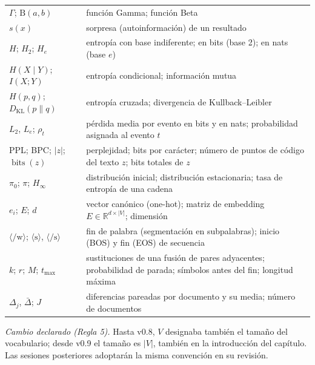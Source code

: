 {\begin{longtable}{@{}>{\raggedright\arraybackslash}p{37mm}>{\raggedright\arraybackslash}p{\dimexpr\textwidth-37mm-2\tabcolsep\relax}@{}}
$\Gamma$; $\mathrm B(a,b)$ & función Gamma; función Beta\\
$s(x)$ & sorpresa (autoinformación) de un resultado\\
$H$; $H_2$; $H_e$ & entropía con base indiferente; en bits (base 2); en nats (base $e$)\\
$H(X\mid Y)$; $I(X;Y)$ & entropía condicional; información mutua\\
$H(p,q)$; $D_{\mathrm{KL}}(p\|q)$ & entropía cruzada; divergencia de Kullback--Leibler\\
$L_2$, $L_e$; $\rho_t$ & pérdida media por evento en bits y en nats; probabilidad asignada al evento $t$\\
PPL; BPC; $|z|$; $\operatorname{bits}(z)$ & perplejidad; bits por carácter; número de puntos de código del texto $z$; bits totales de $z$\\
$\pi_0$; $\pi$; $H_\infty$ & distribución inicial; distribución estacionaria; tasa de entropía de una cadena\\
$e_i$; $E$; $d$ & vector canónico (one-hot); matriz de embedding $E\in\mathbb R^{d\times|V|}$; dimensión\\
$\langle/\mathrm w\rangle$; $\langle\mathrm s\rangle$, $\langle/\mathrm s\rangle$ & fin de palabra (segmentación en subpalabras); inicio (BOS) y fin (EOS) de secuencia\\
$k$; $r$; $M$; $t_{\max}$ & sustituciones de una fusión de pares adyacentes; probabilidad de parada; símbolos antes del fin; longitud máxima\\
$\Delta_j$, $\bar\Delta$; $J$ & diferencias pareadas por documento y su media; número de documentos\\\bottomrule
\end{longtable}}
\noindent\textit{Cambio declarado (Regla 5).} Hasta v0.8, $V$ designaba también el
tamaño del vocabulario; desde v0.9 el tamaño es $|V|$, también en la introducción
del capítulo. Las sesiones posteriores adoptarán la misma convención en su revisión.
